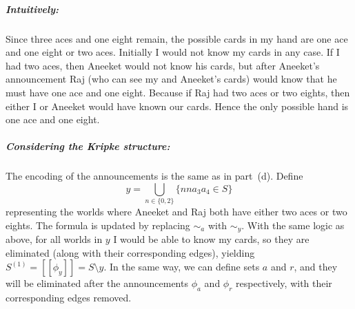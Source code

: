 \subparagraph*{Intuitively:}
Since three aces and one eight remain,
the possible cards in my hand are one ace and 
one eight or two aces.
Initially I would not know my cards in any case.
If I had two aces, then Aneeket would not know his cards, 
but after Aneeket's announcement
Raj (who can see my and Aneeket's cards) 
would know that he must have one ace and one eight.
Because if Raj had two aces or two eights, then either 
I or Aneeket would have known our cards.
Hence the only possible hand is one ace and one eight.

\subparagraph*{Considering the Kripke structure:}
The encoding of the announcements is the same as in part~(d). 
Define
\[
y = \bigcup_{n \in \{0,2\}} \{ n n a_3 a_4 \in S \}
\]
representing the worlds where Aneeket and Raj both have 
either two aces or two eights.
The formula  is updated by replacing $\sim_a$ 
with $\sim_y$.
With the same logic as above, for all worlds in $y$ 
I would be able to know my cards, so they are eliminated 
(along with their corresponding edges), yielding
$S^{(1)} = [\![ \phi_y ]\!] = S \setminus y$.
In the same way, we can define sets $a$ and $r$, 
and they will be eliminated after the announcements 
$\phi_a$ and $\phi_r$ respectively, with their corresponding edges removed.